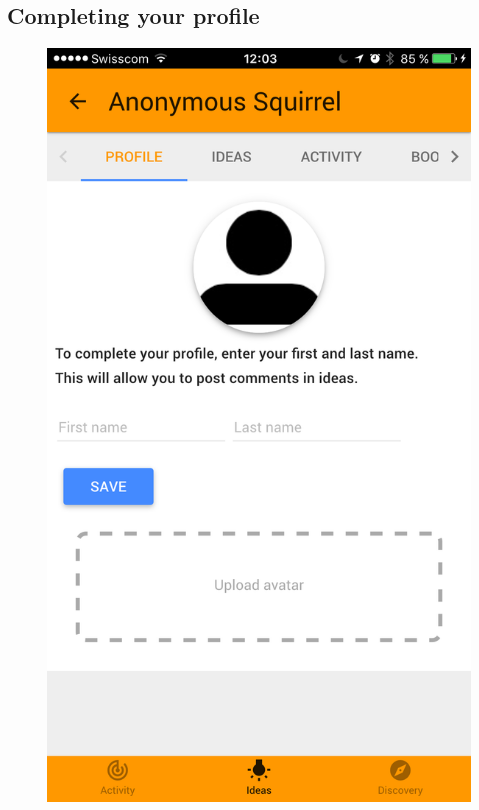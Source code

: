 \documentclass[a4paper,12pt,twoside]{article}
\begin{document}
\clearpage
\subsection{Completing your profile}
\label{sec.completingProfile}

\begin{figure}[!htb]
    \begin{minipage}[t]{.32\textwidth}
        \centering
        \includegraphics[width=\textwidth]{images/flow_completingProfile_1.png}

\end{minipage}
\end{figure}
\end{document}
